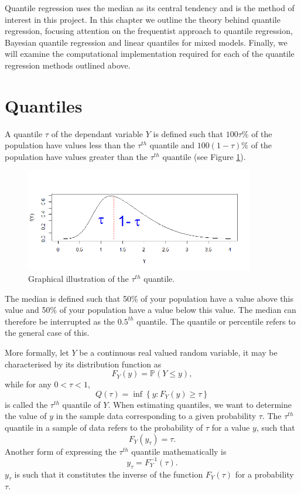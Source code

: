 \documentclass[12pt,a4paper]{report}
\begin{document}
Quantile regression uses the median as its central tendency and is the method of interest in this project. In this chapter we outline the theory behind quantile regression, focusing attention on the frequentist approach to quantile regression, Bayesian quantile regression and linear quantiles for mixed models. Finally, we will examine the computational implementation required for each of the quantile regression methods outlined above.

\section{Quantiles}
A quantile $\tau$ of the dependant variable $Y$ is defined such that $100\tau\%$ of the population have values less than the $\tau^{th}$ quantile and $100(1-\tau)\%$ of the population have values greater than the $\tau^{th}$ quantile (see Figure \ref{Graph:Quantile}).
\vspace{2mm}

\begin{figure}[ht]\centering
    \includegraphics[width=10cm]{Quantiles.png}
    \caption{Graphical illustration of the $\tau^{th}$ quantile.}
    \label{Graph:Quantile}
\end{figure}

The median is defined such that 50\% of your population have a value above this value and 50\% of your population have a value below this value. The median can therefore be interrupted as the $0.5^{th}$ quantile. The quantile or percentile refers to the general case of this.
\vspace{2mm}

More formally, let $Y$ be a continuous real valued random variable, it may be characterised by its distribution function as
    $$F_{Y}(y)=\mathbb{P}(Y \leq y),$$
while for any $0 < \tau <1$,
    $$ Q(\tau) = \inf\left\{y : F_{Y}(y) \geq \tau\right\}$$
is called the $\tau^{th}$ quantile of $Y$. When estimating quantiles, we want to determine the value of $y$ in the sample data corresponding to a given probability $\tau$. The $\tau^{th}$ quantile in a sample of data refers to the probability of $\tau$ for a value $y$, such that
    $$F_{Y}(y_{\tau})=\tau.$$
Another form of expressing the $\tau^{th}$ quantile mathematically is
    $$y_{\tau}=F^{-1}_{Y}(\tau).$$
$y_{\tau}$ is such that it constitutes the inverse of the function $F_{Y}(\tau)$ for a probability $\tau$.
\vspace{2mm}
\end{document}
